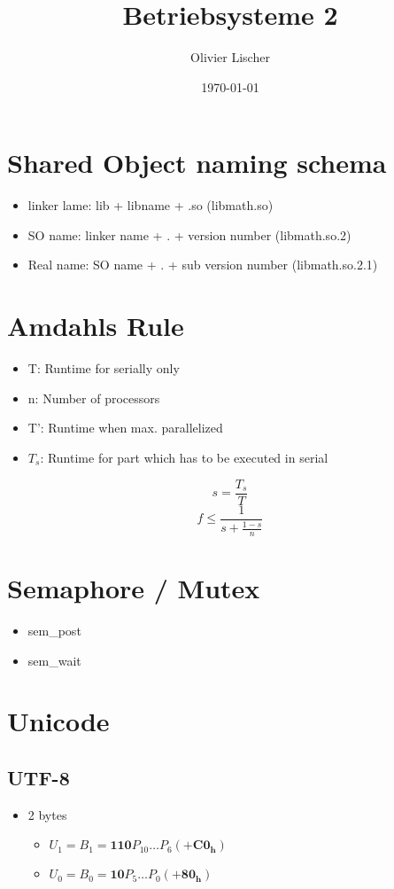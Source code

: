 \documentclass[11pt,twoside,landscape]{article}
\author{Olivier Lischer}
\date{\today}
\title{Betriebsysteme 2}
\begin{document}
\maketitle
\begin{multicols}{3}

\section*{Shared Object naming schema}
\begin{itemize}
\item linker lame: lib + libname + .so (libmath.so)
\item SO name: linker name + . + version number (libmath.so.2)
\item Real name: SO name + . + sub version number (libmath.so.2.1)
\end{itemize}

\section*{Amdahls Rule}
\begin{itemize}
\item T: Runtime for serially only
\item n: Number of processors
\item T': Runtime when max. parallelized
\item \(T_s\): Runtime for part which has to be executed in serial
\end{itemize}
\begin{equation*}
  s = \frac{T_s}{T}
\end{equation*}
\begin{equation*}
  f \leq \frac{1}{s + \frac{1-s}{n}}
\end{equation*}

\section*{Semaphore / Mutex}
\begin{itemize}
\item sem\_post
\item sem\_wait
\end{itemize}

\section*{Unicode}
\subsection*{UTF-8}
\begin{itemize}
\item 2 bytes
  \begin{itemize}
  \item \(U_1 = B_1 = \mathbf{110}P_10 \dots P_6 (+\mathbf{C0_h})\)
  \item \(U_0 = B_0 = \mathbf{10}P_5 \dots P_0 (+\mathbf{80_h})\)
  \end{itemize}


\end{itemize}
\end{multicols}
\end{document}
